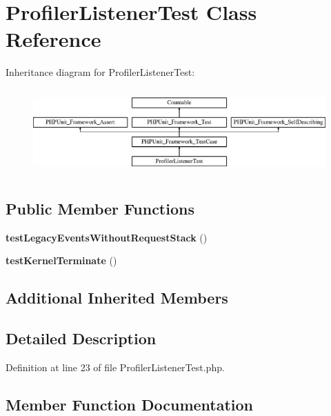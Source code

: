 \section{Profiler\+Listener\+Test Class Reference}
\label{class_symfony_1_1_component_1_1_http_kernel_1_1_tests_1_1_event_listener_1_1_profiler_listener_test}
Inheritance diagram for Profiler\+Listener\+Test\+:\begin{figure}[H]
\begin{center}
\leavevmode
\includegraphics[height=3.303835cm]{class_symfony_1_1_component_1_1_http_kernel_1_1_tests_1_1_event_listener_1_1_profiler_listener_test}
\end{center}
\end{figure}
\subsection*{Public Member Functions}
\begin{DoxyCompactItemize}
\item 
{\bf test\+Legacy\+Events\+Without\+Request\+Stack} ()
\item 
{\bf test\+Kernel\+Terminate} ()
\end{DoxyCompactItemize}
\subsection*{Additional Inherited Members}


\subsection{Detailed Description}


Definition at line 23 of file Profiler\+Listener\+Test.\+php.



\subsection{Member Function Documentation}
